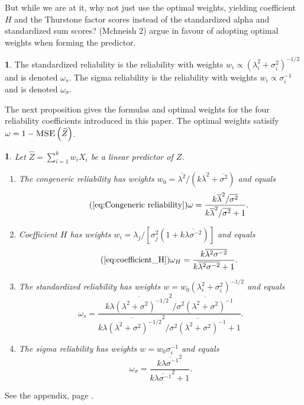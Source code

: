 \documentclass{article}
\makeatletter
\theoremstyle{plain}
\theoremstyle{plain}
\theoremstyle{definition}
\newtheorem{defn}[thm]{\protect\definitionname}
\theoremstyle{remark}
\theoremstyle{definition}
\theoremstyle{plain}
\theoremstyle{plain}
\newtheorem{prop}[thm]{\protect\propositionname}
\theoremstyle{definition}
\newenvironment{proof}[1][\protect\proofname]{\par
	\normalfont\topsep6\p@\@plus6\p@\relax
	\trivlist
	\itemindent\parindent
	\item[\hskip\labelsep\scshape #1]\ignorespaces
}{%
	\endtrivlist\@endpefalse
}
\providecommand{\proofname}{Proof}
\providecommand{\definitionname}{Definition}
\providecommand{\propositionname}{Proposition}
\makeatother
\begin{document}
But while we are at it, why not just use the optimal weights, yielding
coefficient $H$ and the Thurstone factor scores instead of the standardized
alpha and standardized sum scores? (Mchneish 2) argue in favour of
adopting optimal weights when forming the predictor.
\begin{defn}\label{defn:new reliabilities}
The standardized reliability is the reliability with weights $w_{i}\propto(\lambda_{i}^{2}+\sigma_{i}^{2})^{-1/2}$
and is denoted $\omega_{s}$. The sigma reliability is the reliability
with weights $w_{i}\propto\sigma_{i}^{-1}$ and is denoted $\omega_{\sigma}$.
\end{defn}

The next proposition gives the formulas and optimal weights for the
four reliability coefficients introduced in this paper. The optimal
weights satisify $\omega=1-\textsc{MSE}\left(\widehat{Z}\right)$.

\begin{prop}
\label{prop:Z-reliabiltiy}Let $\widehat{Z}=\sum_{i=1}^{k}w_{i}X_{i}$ be a linear predictor of $Z$.

\begin{enumerate}[label=(\roman*)]
\item The congeneric reliability has weights $w_0 =  \overline{\lambda^{2}}/(k\overline{\lambda}^{2}+\overline{\sigma^{2}})$ and equals
\begin{equation}
\tag{\ref{eq:Congeneric reliability}}
\omega=\frac{k\overline{\lambda}^{2}/\overline{\sigma^{2}}}{k\overline{\lambda}^{2}/\overline{\sigma^{2}}+1}.
\end{equation}
\item Coefficient $H$ has weights $w_i =\lambda_{j}/[\sigma_{j}^{2}(1+k\overline{\lambda\sigma^{-2}})]$ and equals
\begin{equation}
\tag{\ref{eq:coefficient_H}}
\omega_{H}=\frac{k\overline{\lambda^{2}\sigma^{-2}}}{k\overline{\lambda^{2}\sigma^{-2}}+1}.
\end{equation}
\item The standardized reliability has weights $w=w_{0}(\lambda_{i}^{2}+\sigma_{i}^{2})^{-1/2}$ and equals
\begin{equation}
\omega_s=\frac{k\overline{\lambda(\lambda^{2}+\sigma^{2})^{-1/2}}^{2}/\overline{\sigma^{2}(\lambda^{2}+\sigma^{2})^{-1}}}{k\overline{\lambda(\lambda^{2}+\sigma^{2})^{-1/2}}^{2}/\overline{\sigma^{2}(\lambda^{2}+\sigma^{2})^{-1}}+1}.\label{eq:Standardized reliability}
\end{equation}
\item The sigma reliability has weights $w=w_{0}\sigma_{i}^{-1}$ and equals
\begin{equation}
\omega_\sigma=\frac{k\overline{\lambda\sigma^{-1}}^{2}}{k\overline{\lambda\sigma^{-1}}^{2}+1}.\label{eq:Sigma-standardized reliability}
\end{equation}
\end{enumerate}
\end{prop}
\begin{proof}
See the appendix, page \pageref{proof:Z-reliability}.
\end{proof}
\end{document}
